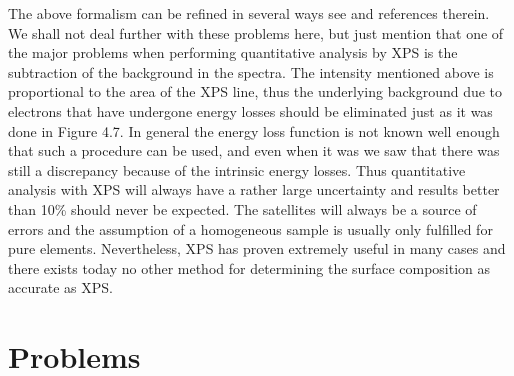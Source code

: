              The above formalism can be refined in  several  ways  see
          \cite{briggs} and references  therein.  We  shall  not  deal
          further with these problems here, but just mention  that  one
          of the major problems when performing quantitative analysis by
          XPS is the subtraction of the background in the spectra. The
          intensity mentioned above is proportional to the area of the
          XPS line, thus the underlying background  due  to  electrons
          that have undergone energy losses should be eliminated  just
          as it was done in Figure 4.7. In general  the energy  loss
          function is not known well enough that such a procedure can  be
          used, and even when it was  we  saw  that  there  was  still  a
          discrepancy because of the  intrinsic  energy  losses.  Thus
          quantitative analysis with XPS will always have a rather large
          uncertainty and results better than  10\%  should  never  be
          expected. The satellites will always be a source  of  errors
          and the assumption of a homogeneous sample is  usually  only
          fulfilled for pure elements. Nevertheless,  XPS  has  proven
          extremely useful in many cases and there exists today no
          other method for determining  the  surface  composition  as
          accurate as XPS.

                   \newpage
\section{Problems}



